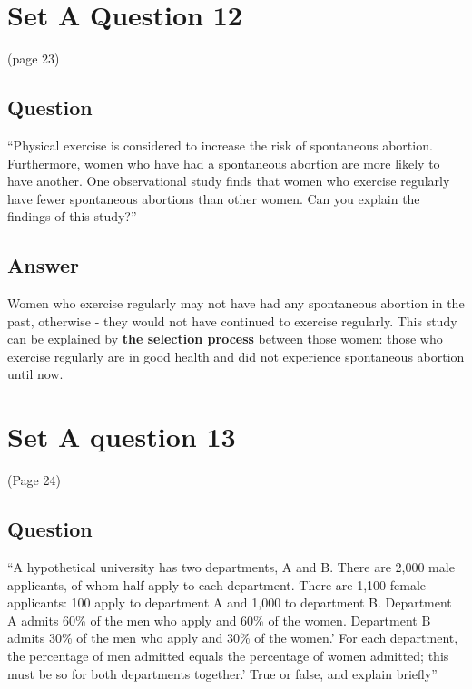 \documentclass[
]{book}
\begin{document}
\hypertarget{set-a-question-12}{%
\chapter{Set A Question 12}\label{set-a-question-12}}

(page 23)

\hypertarget{question-2}{%
\section{Question}\label{question-2}}

``Physical exercise is considered to increase the risk of spontaneous abortion. Furthermore, women who have had a spontaneous abortion are more likely to have another. One observational study finds that women who exercise regularly have fewer spontaneous abortions than other women. Can you explain the findings of this study?''

\hypertarget{answer-2}{%
\section{Answer}\label{answer-2}}

Women who exercise regularly may not have had any spontaneous abortion in the past, otherwise - they would not have continued to exercise regularly. This study can be explained by \textbf{the selection process} between those women: those who exercise regularly are in good health and did not experience spontaneous abortion until now.

\hypertarget{set-a-question-13}{%
\chapter{Set A question 13}\label{set-a-question-13}}

(Page 24)

\hypertarget{question-3}{%
\section{Question}\label{question-3}}

``A hypothetical university has two departments, A and B. There are 2,000 male applicants, of whom half apply to each department. There are 1,100 female applicants: 100 apply to department A and 1,000 to department B. Department A admits 60\% of the men who apply and 60\% of the women. Department B admits 30\% of the men who apply and 30\% of the women.' For each department, the percentage of men admitted equals the percentage of women admitted; this must be so for both departments together.' True or false, and explain briefly''
\end{document}
